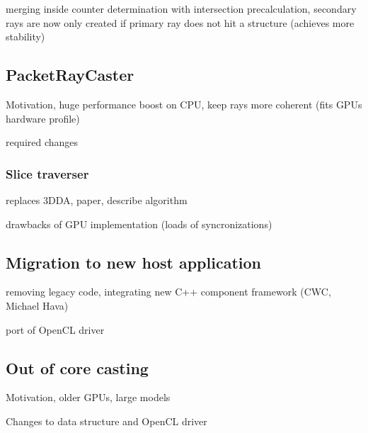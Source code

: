 merging inside counter determination with intersection precalculation, secondary rays are now only created if primary ray does not hit a structure (achieves more stability)

\subsection{PacketRayCaster}

Motivation, huge performance boost on CPU, keep rays more coherent (fits GPUs hardware profile)

required changes

\subsubsection{Slice traverser}

replaces 3DDA, paper, describe algorithm

drawbacks of GPU implementation (loads of syncronizations)

\subsection{Migration to new host application}

removing legacy code, integrating new C++ component framework (CWC, Michael Hava)

port of OpenCL driver

\subsection{Out of core casting}

Motivation, older GPUs, large models

Changes to data structure and OpenCL driver

